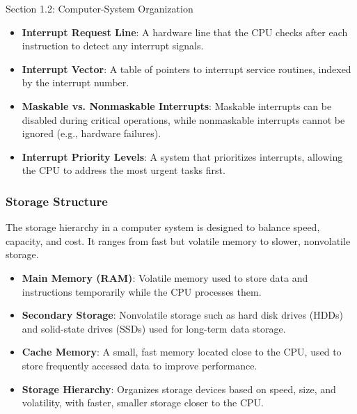 \begin{notes}{Section 1.2: Computer-System Organization}
    \begin{highlight}[Interrupts]
    
    \begin{itemize}
        \item \textbf{Interrupt Request Line}: A hardware line that the CPU checks after each instruction to detect any interrupt signals.
        \item \textbf{Interrupt Vector}: A table of pointers to interrupt service routines, indexed by the interrupt number.
        \item \textbf{Maskable vs. Nonmaskable Interrupts}: Maskable interrupts can be disabled during critical operations, while nonmaskable interrupts cannot be ignored (e.g., hardware failures).
        \item \textbf{Interrupt Priority Levels}: A system that prioritizes interrupts, allowing the CPU to address the most urgent tasks first.
    \end{itemize}
    
    \end{highlight}
    
    \subsubsection*{Storage Structure}
    
    The storage hierarchy in a computer system is designed to balance speed, capacity, and cost. It ranges from fast but volatile memory to slower, nonvolatile storage.
    
    \begin{highlight}
    
    \begin{itemize}
        \item \textbf{Main Memory (RAM)}: Volatile memory used to store data and instructions temporarily while the CPU processes them.
        \item \textbf{Secondary Storage}: Nonvolatile storage such as hard disk drives (HDDs) and solid-state drives (SSDs) used for long-term data storage.
        \item \textbf{Cache Memory}: A small, fast memory located close to the CPU, used to store frequently accessed data to improve performance.
        \item \textbf{Storage Hierarchy}: Organizes storage devices based on speed, size, and volatility, with faster, smaller storage closer to the CPU.
    \end{itemize}
    

\end{highlight}
\end{notes}
